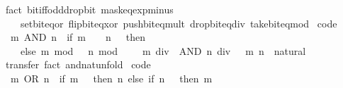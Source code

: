 \begin{isabellebody}
\ {\isacharparenleft}{\kern0pt}fact\ bit{\isacharunderscore}{\kern0pt}iff{\isacharunderscore}{\kern0pt}odd{\isacharunderscore}{\kern0pt}drop{\isacharunderscore}{\kern0pt}bit\ mask{\isacharunderscore}{\kern0pt}eq{\isacharunderscore}{\kern0pt}exp{\isacharunderscore}{\kern0pt}minus{\isacharunderscore}{\kern0pt}{}\isanewline
\ \ \ \ set{\isacharunderscore}{\kern0pt}bit{\isacharunderscore}{\kern0pt}eq{\isacharunderscore}{\kern0pt}or\ flip{\isacharunderscore}{\kern0pt}bit{\isacharunderscore}{\kern0pt}eq{\isacharunderscore}{\kern0pt}xor\ push{\isacharunderscore}{\kern0pt}bit{\isacharunderscore}{\kern0pt}eq{\isacharunderscore}{\kern0pt}mult\ drop{\isacharunderscore}{\kern0pt}bit{\isacharunderscore}{\kern0pt}eq{\isacharunderscore}{\kern0pt}div\ take{\isacharunderscore}{\kern0pt}bit{\isacharunderscore}{\kern0pt}eq{\isacharunderscore}{\kern0pt}mod{\isacharparenright}{\kern0pt}{\isacharplus}{\kern0pt}%
\endisatagproof
{\isafoldproof}%
%
\isadelimproof
\isanewline
%
\endisadelimproof
\isanewline
{}\isamarkupfalse%
\ {\isacharbrackleft}{\kern0pt}code{\isacharbrackright}{\kern0pt}{\isacharcolon}{\kern0pt}\isanewline
\ \ {\isacartoucheopen}m\ AND\ n\ {\isacharequal}{\kern0pt}\ {\isacharparenleft}{\kern0pt}if\ m\ {\isacharequal}{\kern0pt}\ {}\ {\isasymor}\ n\ {\isacharequal}{\kern0pt}\ {}\ then\ {}\isanewline
\ \ \ \ else\ {\isacharparenleft}{\kern0pt}m\ mod\ {}{\isacharparenright}{\kern0pt}\ {\isacharasterisk}{\kern0pt}\ {\isacharparenleft}{\kern0pt}n\ mod\ {}{\isacharparenright}{\kern0pt}\ {\isacharplus}{\kern0pt}\ {}\ {\isacharasterisk}{\kern0pt}\ {\isacharparenleft}{\kern0pt}{\isacharparenleft}{\kern0pt}m\ div\ {}{\isacharparenright}{\kern0pt}\ AND\ {\isacharparenleft}{\kern0pt}n\ div\ {}{\isacharparenright}{\kern0pt}{\isacharparenright}{\kern0pt}{\isacharparenright}{\kern0pt}{\isacartoucheclose}\ \ m\ n\ {\isacharcolon}{\kern0pt}{\isacharcolon}{\kern0pt}\ natural\isanewline
%
\isadelimproof
\ \ %
\endisadelimproof
%
\isatagproof
{}\isamarkupfalse%
\ transfer\ {\isacharparenleft}{\kern0pt}fact\ and{\isacharunderscore}{\kern0pt}nat{\isacharunderscore}{\kern0pt}unfold{\isacharparenright}{\kern0pt}%
\endisatagproof
{\isafoldproof}%
%
\isadelimproof
\isanewline
%
\endisadelimproof
\isanewline
{}\isamarkupfalse%
\ {\isacharbrackleft}{\kern0pt}code{\isacharbrackright}{\kern0pt}{\isacharcolon}{\kern0pt}\isanewline
\ \ {\isacartoucheopen}m\ OR\ n\ {\isacharequal}{\kern0pt}\ {\isacharparenleft}{\kern0pt}if\ m\ {\isacharequal}{\kern0pt}\ {}\ then\ n\ else\ if\ n\ {\isacharequal}{\kern0pt}\ {}\ then\ m\isanewline

\end{isabellebody}
